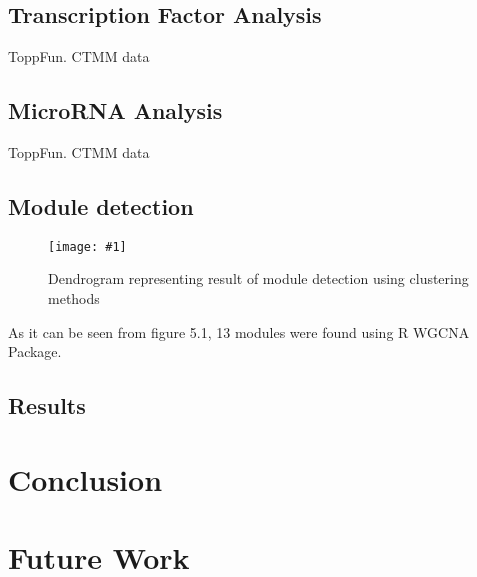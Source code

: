 \documentclass{ba-kecs}
\numberwithin{figure}{section}
\numberwithin{equation}{section}
\newcommand{\dkepic}[2]{ %
	\begin{figure}[H] %
	\texttt{[image: \#1]}
	\caption{#2}
	\label{#1}
	\end{figure}
}
\begin{document}
\subsection{Transcription Factor Analysis}
ToppFun. CTMM data
\subsection{MicroRNA Analysis}
ToppFun. CTMM data
\subsection{Module detection}
\dkepic{Dendrogram}{Dendrogram representing result of module detection using clustering methods}
As it can be seen from figure 5.1, 13 modules were found using R WGCNA Package.
\subsection{Results}

\section{Conclusion}

\section{Future Work}



\end{document}
